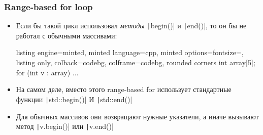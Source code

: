 \documentclass[10pt]{beamer}
\begin{document}
\begin{frame}[fragile]
\frametitle{Range-based for loop}
\begin{itemize}
\item Если бы такой цикл использовал \textit{методы} \texttt|begin()| и \texttt|end()|, то он бы не работал с обычными массивами:
\begin{tcblisting}{listing engine=minted, minted language=cpp, minted options={fontsize=\scriptsize}, listing only, colback=codebg, colframe=codebg, rounded corners}
int array[5];
for (int v : array) { ... }
\end{tcblisting}
\pause
{}
\item На самом деле, вместо этого range-based for использует стандартные функции \texttt|std::begin()| И \texttt|std::end()|
\pause
\item Для обычных массивов они возвращают нужные указатели, а иначе вызывают метод \texttt|v.begin()| или \texttt|v.end()|
\end{itemize}
\end{frame}
\end{document}
